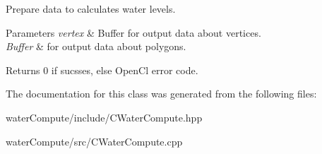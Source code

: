 Prepare data to calculates water levels. 
\begin{DoxyParams}{Parameters}
{\em vertex} & Buffer for output data about vertices. \\
\hline
{\em Buffer} & for output data about polygons. \\
\hline
\end{DoxyParams}
\begin{DoxyReturn}{Returns}
0 if sucsses, else Open\+Cl error code. 
\end{DoxyReturn}


The documentation for this class was generated from the following files\+:\begin{DoxyCompactItemize}
\item 
water\+Compute/include/C\+Water\+Compute.\+hpp\item 
water\+Compute/src/C\+Water\+Compute.\+cpp\end{DoxyCompactItemize}
